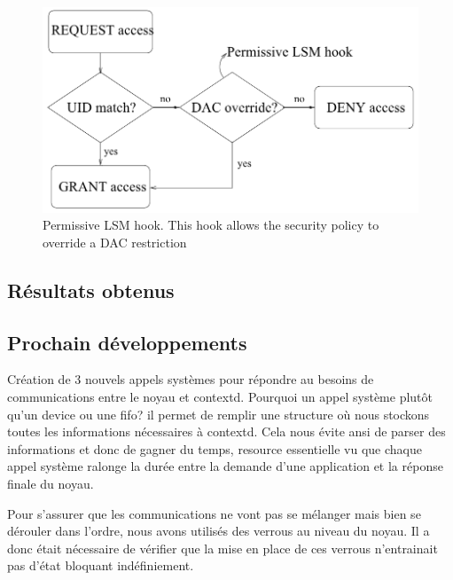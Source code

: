 \documentclass[pdftex,a4paper,titlepage,11pt,openright]{article}
\begin{document}
\begin{figure}[hb]
	\centering
	\includegraphics[scale=0.45]{lsm2.png}
	\caption{Permissive LSM hook. This hook allows the security policy to override a DAC restriction \cite{LSMINTRO}}
\end{figure}

\newpage

\subsection{Résultats obtenus}


\subsection{Prochain développements}

Création de 3 nouvels appels systèmes pour répondre au besoins de communications entre le noyau et contextd. Pourquoi un appel système plutôt qu'un device ou une fifo? il permet de remplir une structure où nous stockons toutes les informations nécessaires à contextd. Cela nous évite ansi de parser des informations et donc de gagner du temps, resource essentielle vu que chaque appel système ralonge la durée entre la demande d'une application et la réponse finale du noyau.


Pour s'assurer que les communications ne vont pas se mélanger mais bien se dérouler dans l'ordre, nous avons utilisés des verrous au niveau du noyau. Il a donc était nécessaire de vérifier que la mise en place de ces verrous n'entrainait pas d'état bloquant indéfiniement.

\end{document}
